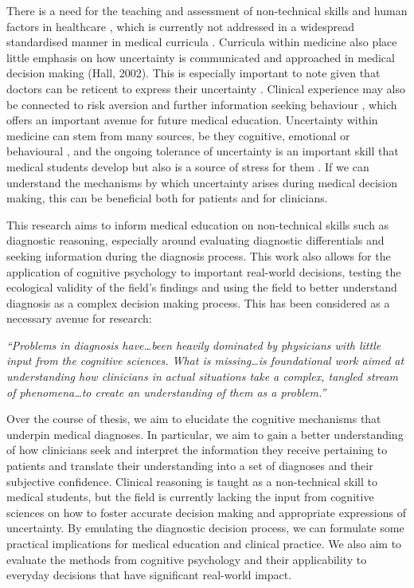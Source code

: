 \documentclass[a4paper, nobind]{templates/ociamthesis}
\begin{document}
\hfill\break
There is a need for the teaching and assessment of non-technical skills and human factors in healthcare \autocite{higham_observer-based_2019}, which is currently not addressed in a widespread standardised manner in medical curricula \autocite{greig_lack_2015}. Curricula within medicine also place little emphasis on how uncertainty is communicated and approached in medical decision making (Hall, 2002). This is especially important to note given that doctors can be reticent to express their uncertainty \autocite{katz_why_1984}. Clinical experience may also be connected to risk aversion and further information seeking behaviour \autocite{lawton_are_2019}, which offers an important avenue for future medical education. Uncertainty within medicine can stem from many sources, be they cognitive, emotional or behavioural \autocite{han_varieties_2011,lee_towards_2021}, and the ongoing tolerance of uncertainty is an important skill that medical students develop but also is a source of stress for them \autocite{hancock_tolerance_2020,stephens_exploring_2021}. If we can understand the mechanisms by which uncertainty arises during medical decision making, this can be beneficial both for patients and for clinicians.

\hfill\break
This research aims to inform medical education on non-technical skills such as diagnostic reasoning, especially around evaluating diagnostic differentials and seeking information during the diagnosis process. This work also allows for the application of cognitive psychology to important real-world decisions, testing the ecological validity of the field's findings and using the field to better understand diagnosis as a complex decision making process. This has been considered as a necessary avenue for research:

\hfill\break
\emph{``Problems in diagnosis have\ldots been heavily dominated by physicians with little input from the cognitive sciences. What is missing\ldots is foundational work aimed at understanding how clinicians in actual situations take a complex, tangled stream of phenomena\ldots to create an understanding of them as a problem.''} \autocite{wears_diagnosing_2014}

\hfill\break
Over the course of thesis, we aim to elucidate the cognitive mechanisms that underpin medical diagnoses. In particular, we aim to gain a better understanding of how clinicians seek and interpret the information they receive pertaining to patients and translate their understanding into a set of diagnoses and their subjective confidence. Clinical reasoning is taught as a non-technical skill to medical students, but the field is currently lacking the input from cognitive sciences on how to foster accurate decision making and appropriate expressions of uncertainty. By emulating the diagnostic decision process, we can formulate some practical implications for medical education and clinical practice. We also aim to evaluate the methods from cognitive psychology and their applicability to everyday decisions that have significant real-world impact.
\end{document}
